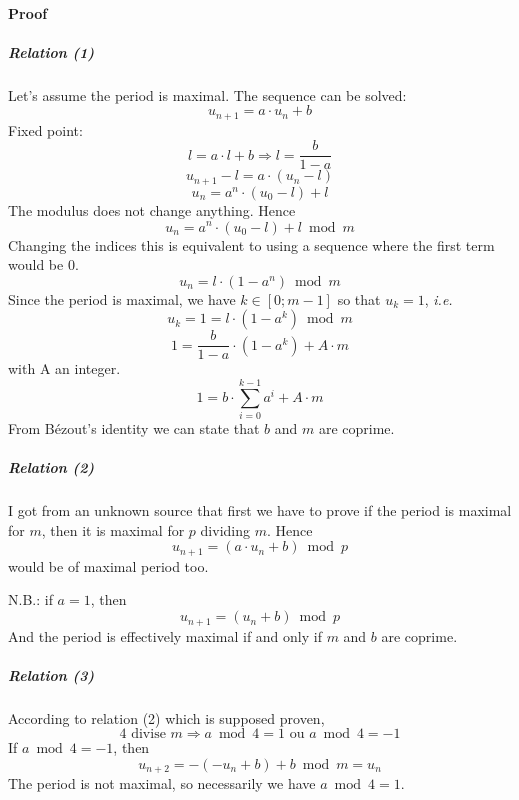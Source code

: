 \documentclass[10pt,a4paper]{article}
\def\ie{\textsl{i.e.}\xspace}
\begin{document}
\paragraph{Proof}
\subparagraph{Relation (1)}

Let's assume the period is maximal. The sequence can be solved:
\[
u_{n+1} = a \cdot u_n + b
\]
Fixed point:
\[
l = a \cdot l + b \Rightarrow l = \frac{b}{1-a}
\]
\[
u_{n+1} - l = a \cdot (u_n - l)
\]
\[
u_n = a^n \cdot (u_0 - l) + l
\]
The modulus does not change anything. Hence
\[
\boxed{ u_n = a^n \cdot (u_0 - l) + l \bmod m }
\]
Changing the indices this is equivalent to using a sequence where the first term
would be 0.
\[
u_n =  l \cdot (1 - a^n) \bmod m
\]
Since the period is maximal, we have $k \in [0;m-1]$ so that  $u_k = 1$, \ie
\[
u_k = 1 = l \cdot (1 - a^k) \bmod m
\]
\[
1 = \frac{b}{1-a} \cdot (1 - a^k) + A\cdot m
\]
with A an integer.
\[
\boxed{ 1 = b \cdot \sum_{i=0}^{k-1} a^i + A\cdot m }
\]
From Bézout's identity we can state that $b$ and $m$ are coprime.

\subparagraph{Relation (2)}
I got from an unknown source that first we have to prove if the period is
maximal for $m$, then it is maximal for $p$ dividing $m$. Hence
\[
u_{n+1} = (a \cdot u_n + b) \bmod p
\]
would be of maximal period too.

N.B.: if $a=1$, then
\[
u_{n+1} = (u_n + b) \bmod p
\]
And the period is effectively maximal if and only if $m$ and $b$ are coprime.

\subparagraph{Relation (3)}
According to relation (2) which is supposed proven,
\[
4 \text{ divise } m \Rightarrow a \bmod 4 = 1 \text{ ou } a \bmod 4 = -1
\]
If $a \bmod 4 = -1$, then
\[
u_{n+2} = -(-u_n + b) + b \bmod m = u_n
\]
The period is not maximal, so necessarily we have $a \bmod 4 = 1$.


\end{document}
